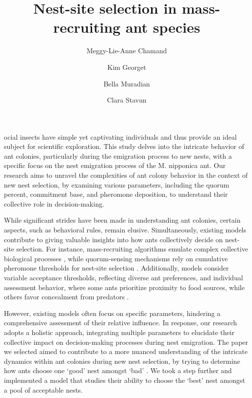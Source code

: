 \documentclass[9pt]{pnas-new}
\title{Nest-site selection in mass-recruiting ant species}
\author{Meggy-Lie-Anne Chamand}
\author{Kim Georget}
\author{Bella Muradian}
\author{Clara Stavun}
\affil{Collective behaviour course research seminar report}
\begin{document}
\verticaladjustment{-2pt}

\maketitle
\thispagestyle{firststyle}

ocial insects have simple yet captivating individuals and thus provide an ideal subject for scientific exploration. This study delves into the intricate behavior of ant colonies, particularly during the emigration process to new nests, with a specific focus on the nest emigration process of the M. nipponica ant. Our research aims to unravel the complexities of ant colony behavior in the context of new nest selection, by examining various parameters, including the quorum percent, commitment base, and pheromone deposition, to understand their collective role in decision-making.

While significant strides have been made in understanding ant colonies, certain aspects, such as behavioral rules, remain elusive. Simultaneously, existing models contribute to giving valuable insights into how ants collectively decide on nest-site selection. For instance, mass-recruiting algorithms emulate complex collective biological processes \cite{computational_model}, while quorum-sensing mechanisms rely on cumulative pheromone thresholds for nest-site selection \cite{quorum_sensing_recruitment}. Additionally, models consider variable acceptance thresholds, reflecting diverse ant preferences, and individual assessment behavior, where some ants prioritize proximity to food sources, while others favor concealment from predators \cite{variability_individual_assessment}.

However, existing models often focus on specific parameters, hindering a comprehensive assessment of their relative influence. In response, our research adopts a holistic approach, integrating multiple parameters to elucidate their collective impact on decision-making processes during nest emigration. The paper we selected aimed to contribute to a more nuanced understanding of the intricate dynamics within ant colonies during new nest selection, by trying to determine how ants choose one ‘good’ nest amongst ‘bad’  \cite{agent_based_model}. We took a step further and implemented a model that studies their ability to choose the ‘best’ nest amongst a pool of acceptable nests.  
\end{document}

